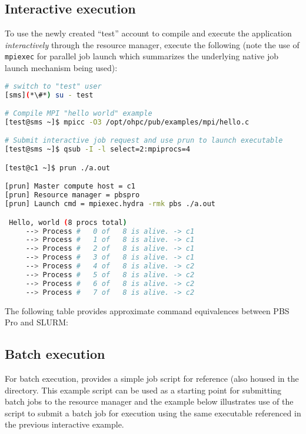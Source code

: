 \subsection{Interactive execution}
To use the newly created ``test'' account to compile and execute the
application {\em interactively} through the resource manager, execute the
following (note the use of \texttt{mpiexec} for parallel job launch which summarizes
the underlying native job launch mechanism being used):

\begin{lstlisting}[language=bash,keywords={}]
# switch to "test" user
[sms](*\#*) su - test

# Compile MPI "hello world" example
[test@sms ~]$ mpicc -O3 /opt/ohpc/pub/examples/mpi/hello.c

# Submit interactive job request and use prun to launch executable
[test@sms ~]$ qsub -I -l select=2:mpiprocs=4

[test@c1 ~]$ prun ./a.out

[prun] Master compute host = c1
[prun] Resource manager = pbspro
[prun] Launch cmd = mpiexec.hydra -rmk pbs ./a.out

 Hello, world (8 procs total)
     --> Process #   0 of   8 is alive. -> c1
     --> Process #   1 of   8 is alive. -> c1
     --> Process #   2 of   8 is alive. -> c1
     --> Process #   3 of   8 is alive. -> c1
     --> Process #   4 of   8 is alive. -> c2
     --> Process #   5 of   8 is alive. -> c2
     --> Process #   6 of   8 is alive. -> c2
     --> Process #   7 of   8 is alive. -> c2
\end{lstlisting}


\begin{center}
\begin{tcolorbox}[]
The following table provides approximate command equivalences between PBS Pro
and SLURM:

\vspace*{0.15cm}

\end{tcolorbox}
\end{center}

\subsection{Batch execution}

For batch execution, \OHPC{} provides a simple job script for reference (also
housed in the  directory. This example script can
be used as a starting point for submitting batch jobs to the resource manager
and the example below illustrates use of the script to submit a batch job for
execution using the same executable referenced in the previous interactive
example.

